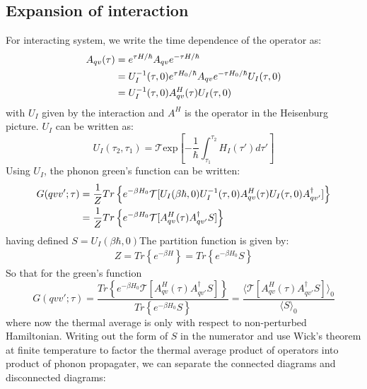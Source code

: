 \documentclass{article}
\begin{document}
\subsection{Expansion of interaction}
For interacting system, we write the time dependence of the operator as:
\begin{align}
    A_{qv}(\tau)&= e^{\tau H/\hbar} A_{qv}  e^{-\tau H/\hbar} \notag \\
                &= U_I^{-1}(\tau,0) e^{\tau H_0/\hbar} A_{qv}  e^{-\tau H_0/\hbar} U_I(\tau,0) \notag \\
                &= U_I^{-1}(\tau,0) A^H_{qv}(\tau)  U_I(\tau,0)
\end{align}
with $U_I$ given by the interaction and $A^H$ is the operator in the Heisenburg picture. $U_I$ can be written as:
\begin{equation}
    U_I(\tau_2, \tau_1) = \mathcal{T} \text{exp} \left[ -\frac{1}{\hbar} \int_{\tau_1}^{\tau_2} H_I(\tau')d\tau' \right]
\end{equation}
Using $U_I$, the phonon green's function can be written:
\begin{align}
    G(qvv';\tau) &= \frac{1}{Z} Tr\left\{ e^{-\beta H_0} \mathcal{T}[ U_I(\beta \hbar,0) U_I^{-1}(\tau,0) A^H_{qv}(\tau)  U_I(\tau,0) A_{qv'}^{\dagger} ] \right\} \notag \\
            &= \frac{1}{Z} Tr\left\{ e^{-\beta H_0} \mathcal{T}[ A^H_{qv}(\tau) A_{qv'}^{\dagger} S ] \right\} 
\end{align}
having defined $S = U_I(\beta\hbar,0)$The partition function is given by:
\begin{align}
    Z = Tr\left\{ e^{-\beta H} \right\} = Tr\left\{ e^{-\beta H_0} S \right\}
\end{align}
So that for the green's function
\begin{equation}
    G(qvv';\tau) = 
    \frac{ Tr\left\{ e^{-\beta H_0} \mathcal{T}\left[ A^H_{qv}(\tau) A_{qv'}^{\dagger} S\right] \right\} }{ Tr\left\{ e^{-\beta H_0} S \right\} }
    = \frac{\langle \mathcal{T}[ A^H_{qv}(\tau) A_{qv'}^{\dagger} S] \rangle_0}{\langle  S \rangle_0}
\end{equation}
where now the thermal average is only with respect to non-perturbed Hamiltonian. 
Writing out the form of $S$ in the numerator and use Wick's theorem at finite temperature to factor the thermal average product of operators into 
product of phonon propagater, we can separate the connected diagrams and disconnected diagrams:
\end{document}
